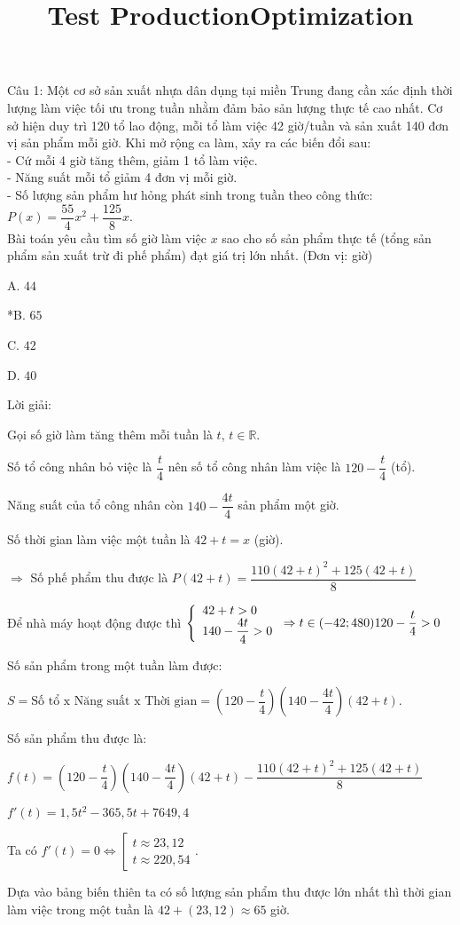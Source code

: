 \documentclass[a4paper,12pt]{article}
\begin{document}
\title{Test ProductionOptimization}
\maketitle

Câu 1: Một cơ sở sản xuất nhựa dân dụng tại miền Trung đang cần xác định thời lượng làm việc tối ưu trong tuần nhằm đảm bảo sản lượng thực tế cao nhất. Cơ sở hiện duy trì 120 tổ lao động, mỗi tổ làm việc 42 giờ/tuần và sản xuất 140 đơn vị sản phẩm mỗi giờ. Khi mở rộng ca làm, xảy ra các biến đổi sau:\\- Cứ mỗi 4 giờ tăng thêm, giảm 1 tổ làm việc.\\- Năng suất mỗi tổ giảm 4 đơn vị mỗi giờ.\\- Số lượng sản phẩm hư hỏng phát sinh trong tuần theo công thức: \( P(x) = \dfrac{55}{4}x^2 + \dfrac{125}{8}x \).\\Bài toán yêu cầu tìm số giờ làm việc \(x\) sao cho số sản phẩm thực tế (tổng sản phẩm sản xuất trừ đi phế phẩm) đạt giá trị lớn nhất. (Đơn vị: giờ)

A. \(44\)

*B. \(65\)

C. \(42\)

D. \(40\)

Lời giải:


Gọi số giờ làm tăng thêm mỗi tuần là \(t\), \(t \in \mathbb{R}\).

Số tổ công nhân bỏ việc là \(\dfrac{t}{4}\) nên số tổ công nhân làm việc là \(120 - \dfrac{t}{4}\) (tổ).

Năng suất của tổ công nhân còn \(140 - \dfrac{4t}{4}\) sản phẩm một giờ.

Số thời gian làm việc một tuần là \(42 + t = x\) (giờ).

\(\Rightarrow\) Số phế phẩm thu được là \(P(42 + t) = \dfrac{110(42 + t)^2 + 125(42 + t)}{8}\)

Để nhà máy hoạt động được thì \(\left\{\begin{array}{l}42 + t > 0 \\ 140 - \dfrac{4t}{4} > 0\end{array}\right. \Rightarrow t \in(-42 ; 480) \\ 120 - \dfrac{t}{4} > 0\)

Số sản phẩm trong một tuần làm được:

\(S = \text{Số tổ x Năng suất x Thời gian} = \left(120 - \dfrac{t}{4}\right)\left(140 - \dfrac{4t}{4}\right)(42 + t)\).

Số sản phẩm thu được là:

\(f(t) = \left(120 - \dfrac{t}{4}\right)\left(140 - \dfrac{4t}{4}\right)(42 + t) - \dfrac{110(42 + t)^2 + 125(42 + t)}{8}\)

\(f'(t) = 1,5t^{2} - 365,5t + 7649,4\)

Ta có \(f'(t) = 0 \Leftrightarrow \left[\begin{array}{l}t \approx 23,12 \\ t \approx 220,54\end{array}\right.\).

Dựa vào bảng biến thiên ta có số lượng sản phẩm thu được lớn nhất thì thời gian làm việc trong một tuần là \(42 + (23,12) \approx 65\) giờ.
\end{document}
